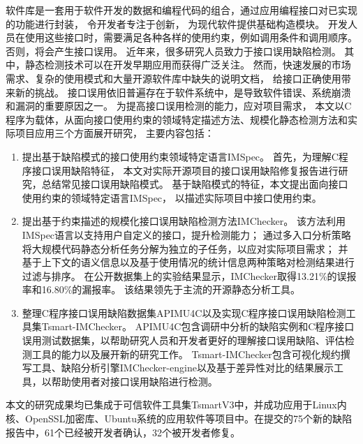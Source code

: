 \begin{cabstract}
  软件库是一套用于软件开发的数据和编程代码的组合，通过应用编程接口对已实现的功能进行封装，
  令开发者专注于创新，
  为现代软件提供基础构造模块。
  开发人员在使用这些接口时，需要满足各种各样的使用约束，例如调用条件和调用顺序。
  否则，将会产生接口误用。
  近年来，很多研究人员致力于接口误用缺陷检测。
  其中，静态检测技术可以在开发早期应用而获得广泛关注。
  然而，快速发展的市场需求、复杂的使用模式和大量开源软件库中缺失的说明文档，
  给接口正确使用带来新的挑战。
  接口误用依旧普遍存在于软件系统中，是导致软件错误、系统崩溃和漏洞的重要原因之一。
  为提高接口误用检测的能力，应对项目需求，
  本文以C程序为载体，从面向接口使用约束的领域特定描述方法、规模化静态检测方法和实际项目应用三个方面展开研究，
  主要内容包括：
  \begin{enumerate}
  	\item 提出基于缺陷模式的接口使用约束领域特定语言IMSpec。
  	首先，为理解C程序接口误用缺陷特征，
  	本文对实际开源项目的接口误用缺陷修复报告进行研究，总结常见接口误用缺陷模式。
  	基于缺陷模式的特征，本文提出面向接口使用约束的领域特定语言IMSpec，
  	以描述实际项目中接口使用约束。
  	\item 提出基于约束描述的规模化接口误用缺陷检测方法IMChecker。
  	该方法利用IMSpec语言以支持用户自定义的接口，提升检测能力；
  	通过多入口分析策略将大规模代码静态分析任务分解为独立的子任务，以应对实际项目需求；
  	并基于上下文的语义信息以及基于使用情况的统计信息两种策略对检测结果进行过滤与排序。
  	在公开数据集上的实验结果显示，IMChecker取得13.21\%的误报率和16.80\%的漏报率。
  	该结果领先于主流的开源静态分析工具。
  	\item 整理C程序接口误用缺陷数据集APIMU4C以及实现C程序接口误用缺陷检测工具集Tsmart-IMChecker。
  	APIMU4C包含调研中分析的缺陷实例和C程序接口误用测试数据集，以帮助研究人员和开发者更好的理解接口误用缺陷、评估检测工具的能力以及展开新的研究工作。
  	Tsmart-IMChecker包含可视化规约撰写工具、缺陷分析引擎IMChecker-engine以及基于差异性对比的结果展示工具，以帮助使用者对接口误用缺陷进行检测。
  \end{enumerate}
  
  本文的研究成果均已集成于可信软件工具集TsmartV3中，并成功应用于Linux内核、OpenSSL加密库、Ubuntu系统的应用软件等项目中。在提交的75个新的缺陷报告中，61个已经被开发者确认，32个被开发者修复。
  
\end{cabstract}


